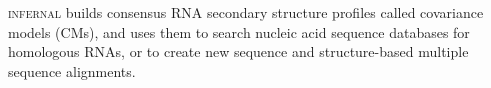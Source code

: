 \textsc{infernal} builds 
consensus RNA secondary structure profiles called covariance models
(CMs), and uses them to search nucleic acid sequence databases for
homologous RNAs, or to create new sequence and structure-based
multiple sequence alignments.
